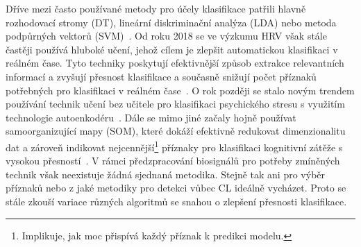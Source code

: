 Dříve mezi často používané metody pro účely klasifikace patřili hlavně
rozhodovací stromy (\gls{DT}), lineární diskriminační analýza (\gls{LDA}) nebo
metoda podpůrných vektorů (\gls{SVM})~\cite{Ishaque2021}. Od roku 2018 se ve
výzkumu HRV však stále častěji používá hluboké učení, jehož cílem je zlepšit
automatickou klasifikaci v reálném čase. Tyto techniky poskytují efektivnější
způsob extrakce relevantních informací a zvyšují přesnost klasifikace a současně
snižují počet příznaků potřebných pro klasifikaci v reálném
čase~\cite{Hwang2018,He2019}. O rok později se stalo novým trendem používání
technik učení bez učitele pro klasifikaci psychického stresu s využitím
technologie autoenkodéru~\cite{Oskooei2019}. Dále se mimo jiné začaly hojně
používat samoorganizující mapy (\gls{SOM}), které dokáží efektivně redukovat
dimenzionalitu dat a zároveň indikovat nejcennější\footnote{Implikuje, jak moc
přispívá každý příznak k predikci modelu.} příznaky pro klasifikaci kognitivní
zátěže s vysokou přesností~\cite{Cho2017}. V rámci předzpracování biosignálů pro
potřeby zmíněných technik však neexistuje žádná sjednaná metodika. Stejně tak
ani pro výběr příznaků nebo z jaké metodiky pro detekci vůbec CL ideálně
vycházet. Proto se stále zkouší variace různých algoritmů se snahou o zlepšení
přesnosti klasifikace.

